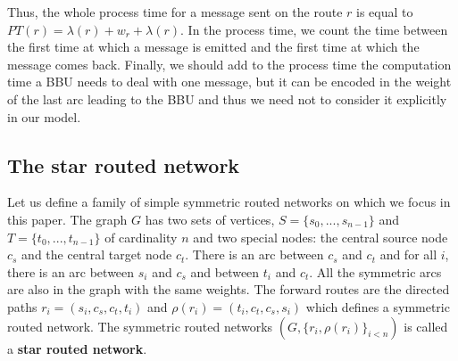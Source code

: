 \documentclass[10pt, conference, letterpaper]{IEEEtran}
\begin{document}
    
      Thus, the whole process time for a message sent on the route $r$ is equal to
      $PT(r)=\lambda(r)+ w_r+\lambda(r)$.      
      In the process time, we count the time between the first time at which a message is emitted and the first time at which the message comes back. 
      Finally, we should add to the process time the computation time a BBU needs to deal with one message, but it can be encoded  in the weight of the last arc leading to the BBU and thus we need not to consider it explicitly in our model.

    
    \subsection{The star routed network}
    
             Let us define a family of simple symmetric routed networks on which we focus in this paper. 
      The graph $G$ has two sets of vertices, $S=\{s_0,...,s_{n-1}\}$ and $T=\{t_0,...,t_{n-1}\}$ of cardinality $n$ and two special nodes:
      the central source node {\bf $c_s$} and the central target node {\bf $c_t$}.
      There is an arc between {\bf $c_s$} and {\bf $c_t$} and for all $i$, there is an arc between $s_i$ and $c_s$ and between $t_i$ and $c_t$.
      All the symmetric arcs are also in the graph with the same weights.
      The forward routes are the directed paths $r_i = (s_i,c_s,c_t,t_i)$ and $\rho(r_i) = (t_i,c_t,c_s,s_i)$ which defines a symmetric routed network. 
      The symmetric routed networks $(G, \{r_i,\rho(r_i)\}_{i<n})$ is called a \textbf{star routed network}.
      
       \begin{center}

  \end{center}
	
\end{document}
